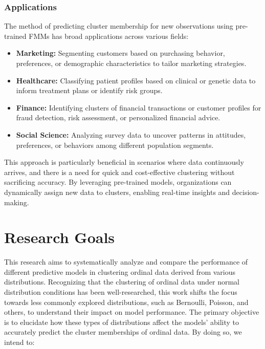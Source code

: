 \documentclass{article}
\begin{document}
\subsubsection*{Applications}

The method of predicting cluster membership for new observations using pre-trained FMMs has broad applications across various fields:

\begin{itemize}
    \item \textbf{Marketing:} Segmenting customers based on purchasing behavior, preferences, or demographic characteristics to tailor marketing strategies.
    \item \textbf{Healthcare:} Classifying patient profiles based on clinical or genetic data to inform treatment plans or identify risk groups.
    \item \textbf{Finance:} Identifying clusters of financial transactions or customer profiles for fraud detection, risk assessment, or personalized financial advice.
    \item \textbf{Social Science:} Analyzing survey data to uncover patterns in attitudes, preferences, or behaviors among different population segments.
\end{itemize}

This approach is particularly beneficial in scenarios where data continuously arrives, and there is a need for quick and cost-effective clustering without sacrificing accuracy. By leveraging pre-trained models, organizations can dynamically assign new data to clusters, enabling real-time insights and decision-making.

\section{Research Goals}

This research aims to systematically analyze and compare the performance of different predictive models in clustering ordinal data derived from various distributions. Recognizing that the clustering of ordinal data under normal distribution conditions has been well-researched, this work shifts the focus towards less commonly explored distributions, such as Bernoulli, Poisson, and others, to understand their impact on model performance. The primary objective is to elucidate how these types of distributions affect the models' ability to accurately predict the cluster memberships of ordinal data. By doing so, we intend to:
\end{document}
